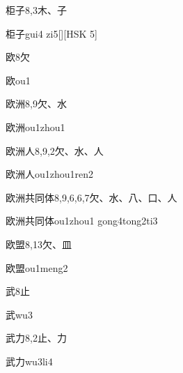 \begin{entry}{柜子}{8,3}{⽊、⼦}
  \begin{phonetics}{柜子}{gui4 zi5}[][HSK 5]
  \end{phonetics}
\end{entry}

\begin{entry}{欧}{8}{⽋}
  \begin{phonetics}{欧}{ou1}
  \end{phonetics}
\end{entry}

\begin{entry}{欧洲}{8,9}{⽋、⽔}
  \begin{phonetics}{欧洲}{ou1zhou1}
  \end{phonetics}
\end{entry}

\begin{entry}{欧洲人}{8,9,2}{⽋、⽔、⼈}
  \begin{phonetics}{欧洲人}{ou1zhou1ren2}
  \end{phonetics}
\end{entry}

\begin{entry}{欧洲共同体}{8,9,6,6,7}{⽋、⽔、⼋、⼝、⼈}
  \begin{phonetics}{欧洲共同体}{ou1zhou1 gong4tong2ti3}
  \end{phonetics}
\end{entry}

\begin{entry}{欧盟}{8,13}{⽋、⽫}
  \begin{phonetics}{欧盟}{ou1meng2}
  \end{phonetics}
\end{entry}

\begin{entry}{武}{8}{⽌}
  \begin{phonetics}{武}{wu3}
  \end{phonetics}
\end{entry}

\begin{entry}{武力}{8,2}{⽌、⼒}
  \begin{phonetics}{武力}{wu3li4}
  \end{phonetics}
\end{entry}

